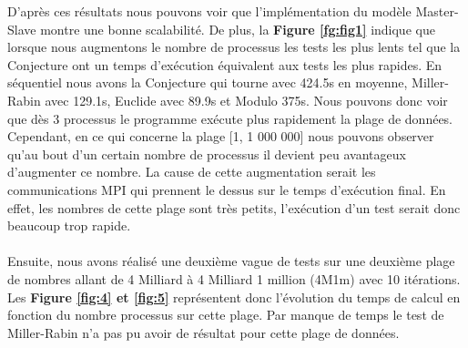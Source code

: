 D'après ces résultats nous pouvons voir que l'implémentation du modèle Master-Slave montre une bonne scalabilité. De plus, la \textbf{Figure \ref{fg:fig1}} indique que lorsque nous augmentons le nombre de processus les tests les plus lents tel que la Conjecture ont un temps d'exécution équivalent aux tests les plus rapides. En séquentiel nous avons la Conjecture qui tourne avec 424.5s en moyenne, Miller-Rabin avec 129.1s, Euclide avec 89.9s et Modulo 375s. Nous pouvons donc voir que dès 3 processus le programme exécute plus rapidement la plage de données.
Cependant, en ce qui concerne la plage [1, 1 000 000] nous pouvons observer qu'au bout d'un certain nombre de processus il devient peu avantageux d'augmenter ce nombre. La cause de cette augmentation serait les communications MPI qui prennent le dessus sur le temps d'exécution final. En effet, les nombres de cette plage sont très petits, l'exécution d'un test serait donc beaucoup trop rapide.\\


	\paragraph{}Ensuite, nous avons réalisé une deuxième vague de tests sur une deuxième plage de nombres allant de 4 Milliard à 4 Milliard 1 million (4M1m) avec 10 itérations. Les \textbf{Figure \ref{fig:4} et \ref{fig:5}} représentent donc l'évolution du temps de calcul en fonction du nombre processus sur cette plage. Par manque de temps le test de Miller-Rabin n'a pas pu avoir de résultat pour cette plage de données.

